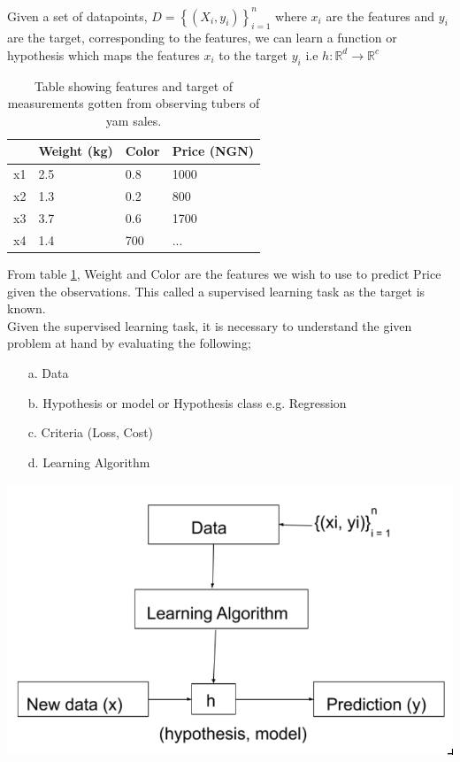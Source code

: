 \documentclass[12pt,a4paper,titlepage,landscape]{book}
\begin{document}
	Given a set of datapoints, $ D = \left\{\left(X_i, y_i\right)\right\}_{i=1}^n $ where $x_i$ are the features and $y_i$ are the target, corresponding to the features, we can learn a function or hypothesis which maps the features $x_i$ to the target $y_i$ i.e $h : \mathbb{R}^d \to \mathbb{R}^c $
	\begin{table}[]\label{data_table}
		\begin{tabular}{|l|l|l|l|}
			\hline
			\textbf{} & \textbf{Weight (kg)} & \textbf{Color} & \textbf{Price (NGN)} \\ \hline
			x1                & 2.5                  & 0.8            & 1000                 \\ \hline
			x2                & 1.3                  & 0.2            & 800                  \\ \hline
			x3                & 3.7                  & 0.6            & 1700                 \\ \hline
			x4                & 1.4                  & 700            & ...                  \\ \hline
		\end{tabular}
	\caption {Table showing features and target of measurements gotten from observing tubers of yam sales. }
	\end{table}
	From table \ref{data_table}, Weight and Color are the features we wish to use to predict Price given the observations. This called a supervised learning task as the target is known.\\
	Given the supervised learning task, it is necessary to understand the given problem at hand by evaluating the following; \\
	\begin{enumerate}
		\item [a.] Data
		\item [b.] Hypothesis or model or Hypothesis class e.g. Regression
		\item [c.] Criteria (Loss, Cost)
		\item[d.] Learning Algorithm
	\end{enumerate}
\begin{center}
	\includegraphics[width=0.7\linewidth, height=0.5\textheight]{model}
\end{center}
	
\end{document}
